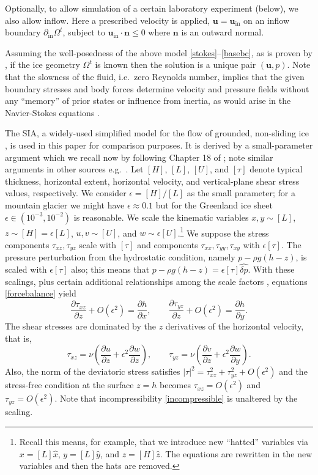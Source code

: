 \documentclass[letterpaper,final,12pt,reqno]{amsart}
\newcommand{\eps}{\epsilon}
\newcommand{\bn}{\mathbf{n}}
\newcommand{\bu}{\mathbf{u}}
\begin{document}
Optionally, to allow simulation of a certain laboratory experiment \cite{SayagWorster2013} (below), we also allow inflow.  Here a prescribed velocity is applied, $\bu = \bu_{\text{in}}$ on an inflow boundary $\partial_{\text{in}} \Omega^t$, subject to $\bu_{\text{in}}\cdot \bn \le 0$ where $\bn$ is an outward normal.

Assuming the well-posedness of the above model \eqref{stokes}--\eqref{basebc}, as is proven by \cite{JouvetRappaz2011}, if the ice geometry $\Omega^t$ is known then the solution is a unique pair $(\bu,p)$.  Note that the slowness of the fluid, i.e.~zero Reynolds number, implies that the given boundary stresses and body forces determine velocity and pressure fields without any ``memory'' of prior states or influence from inertia, as would arise in the Navier-Stokes equations \cite{Fowler1997}.

The SIA, a widely-used simplified model for the flow of grounded, non-sliding ice \cite{SchoofHewitt2013}, is used in this paper for comparison purposes.  It is derived by a small-parameter argument which we recall now by following Chapter 18 of \cite{Fowler1997}; note similar arguments in other sources e.g.~\cite{GreveBlatter2009}.  Let $[H]$, $[L]$, $[U]$, and $[\tau]$ denote typical thickness, horizontal extent, horizontal velocity, and vertical-plane shear stress values, respectively.  We consider $\eps = [H]/[L]$ as the small parameter; for a mountain glacier we might have $\eps \approx 0.1$ but for the Greenland ice sheet $\eps \in (10^{-3},10^{-2})$ is reasonable.  We scale the kinematic variables $x,y \sim [L]$, $z \sim [H] = \eps [L]$, $u,v \sim [U]$, and $w \sim \eps [U]$.\footnote{Recall this means, for example, that we introduce new ``hatted'' variables via $x=[L]\hat x$, $y=[L]\hat y$, and $z=[H] \hat z$.  The equations are rewritten in the new variables and then the hats are removed.}  We suppose the stress components $\tau_{xz},\tau_{yz}$ scale with $[\tau]$ and components $\tau_{xx},\tau_{yy},\tau_{xy}$ with $\eps[\tau]$.   The pressure perturbation from the hydrostatic condition, namely $p-\rho g (h - z)$, is scaled with $\eps [\tau]$ also; this means that $p-\rho g (h - z)=\eps[\tau]\hat{\delta p}$.  With these scalings, plus certain additional relationships among the scale factors \cite[Chapter 18]{Fowler1997}, equations \eqref{forcebalance} yield
    $$\frac{\partial\tau_{xz}}{\partial z} + O(\eps^2) = \frac{\partial h}{\partial x}, \qquad \frac{\partial\tau_{yz}}{\partial z} + O(\eps^2) = \frac{\partial h}{\partial y}.$$
The shear stresses are dominated by the $z$ derivatives of the horizontal velocity, that is,
    $$\tau_{xz} = \nu\left(\frac{\partial u}{\partial z} + \eps^2 \frac{\partial w}{\partial z}\right), \qquad \tau_{yz} = \nu\left(\frac{\partial v}{\partial z} + \eps^2 \frac{\partial w}{\partial y}\right).$$
Also, the norm of the deviatoric stress satisfies $|\tau|^2 = \tau_{xz}^2 + \tau_{yz}^2 + O(\eps^2)$ and the stress-free condition at the surface $z=h$ becomes $\tau_{xz} = O(\eps^2)$ and $\tau_{yz} = O(\eps^2)$.  Note that incompressibility \eqref{incompressible} is unaltered by the scaling.
\end{document}
